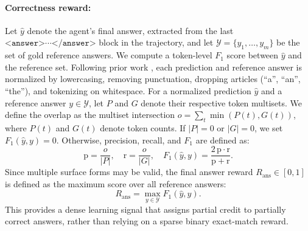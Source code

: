 \documentclass{llmxive}
\begin{document}
\paragraph{Correctness reward:}

Let $\hat{y}$ denote the agent's final answer, extracted from the last
$\texttt{<answer>} \cdots \texttt{</answer>}$ block in the trajectory, and let
$\mathcal{Y}=\{y_1,\dots,y_m\}$ be the set of gold reference answers. We compute
a token-level $F_1$ score between $\hat{y}$ and the reference set. Following
prior work \citep{rajpurkar-etal-2016-squad}, each prediction and reference
answer is normalized by lowercasing, removing punctuation, dropping articles
(``a'', ``an'', ``the''), and tokenizing on whitespace. For a normalized prediction $\hat{y}$ and a reference answer $y \in \mathcal{Y}$,
let $P$ and $G$ denote their respective token multisets. We define the overlap as
the multiset intersection
$o = \sum_t \min(P(t), G(t))$, where $P(t)$ and $G(t)$ denote token counts. If $|P|=0$ or $|G|=0$, we set $F_1(\hat{y}, y)=0$. Otherwise, precision, recall,
and $F_1$ are defined as:
\begin{equation}
\mathrm{p} = \frac{o}{|P|}, \quad
\mathrm{r} = \frac{o}{|G|}, \quad
F_1(\hat{y}, y) = \frac{2\,\mathrm{p}\cdot\mathrm{r}}{\mathrm{p}+\mathrm{r}}.
\end{equation}
Since multiple surface forms may be valid, the final answer reward
$R_{\mathrm{ans}} \in [0,1]$ is defined as the maximum score over all reference
answers:
\begin{equation}
R_{\mathrm{ans}} = \max_{y \in \mathcal{Y}} F_1(\hat{y}, y).
\end{equation}
This provides a dense learning signal that assigns partial credit to partially
correct answers, rather than relying on a sparse binary exact-match reward.
\end{document}
